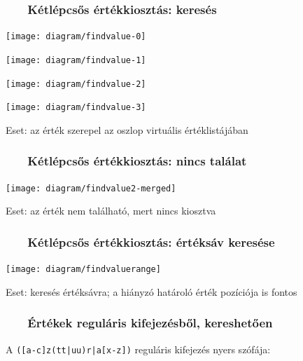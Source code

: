 \documentclass[
    aspectratio=169,
]{beamer}
\newcommand{\slidetitle}[2]{\frametitle{{\small #1 ~ \ding{226} ~ } \normalsize \textbf{#2} }}
\begin{document}
\begin{frame}
    \slidetitle{\sectionshorttitle}{Kétlépcsős értékkiosztás: keresés}
    
    \centering
    
    \begin{overprint}
        \centerline{\texttt{[image: diagram/findvalue-0]}}
        \centerline{\texttt{[image: diagram/findvalue-1]}}
        \centerline{\texttt{[image: diagram/findvalue-2]}}
        \centerline{\texttt{[image: diagram/findvalue-3]}}
    \end{overprint}
    
    \vspace{0.7cm}
    
    Eset: az érték szerepel az oszlop virtuális értéklistájában
\end{frame}

\begin{frame}
    \slidetitle{\sectionshorttitle}{Kétlépcsős értékkiosztás: nincs találat}
    
    \centering
    
    \texttt{[image: diagram/findvalue2-merged]}
    
    \vspace{0.7cm}
    
    Eset: az érték nem található, mert nincs kiosztva
\end{frame}

\begin{frame}
    \slidetitle{\sectionshorttitle}{Kétlépcsős értékkiosztás: értéksáv keresése}
    
    \centering
    
    \texttt{[image: diagram/findvaluerange]}
    
    \vspace{0.7cm}
    
    Eset: keresés értéksávra; a hiányzó határoló érték pozíciója is fontos
\end{frame}

\begin{frame}[t]
    \slidetitle{\sectionshorttitle}{Értékek reguláris kifejezésből, kereshetően}
    \centering
    {\Large A \texttt{\colorbox{Goldenrod!10}{([a-c]z(tt|uu)r|a[x-z])}} reguláris kifejezés {\color{red}nyers} szófája:}
    
    \vspace{1.2cm}
    
    
\end{frame}
\end{document}
